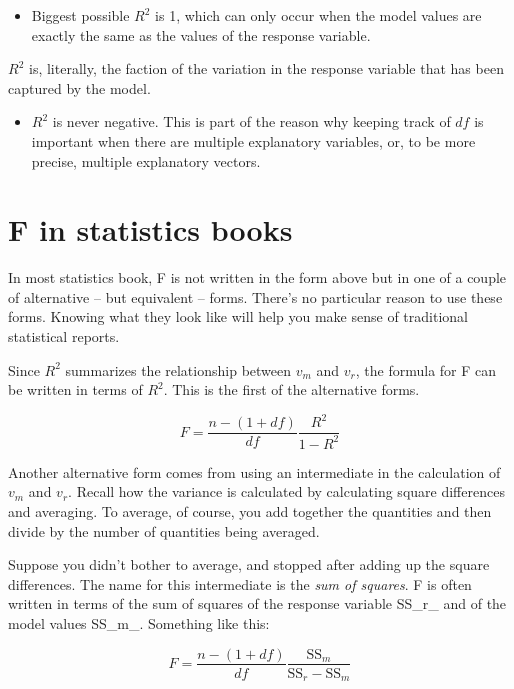 \documentclass[]{book}
\providecommand{\tightlist}{%
  \setlength{\itemsep}{0pt}\setlength{\parskip}{0pt}}
\begin{document}
\begin{itemize}
\tightlist
\item
  Biggest possible \(R^2\) is 1, which can only occur when the model values are exactly the same as the values of the response variable.
\end{itemize}

\(R^2\) is, literally, the faction of the variation in the response variable that has been captured by the model.

\begin{itemize}
\tightlist
\item
  \(R^2\) is never negative. This is part of the reason why keeping track of \(df\) is important when there are multiple explanatory variables, or, to be more precise, multiple explanatory vectors.
\end{itemize}

\hypertarget{f-in-statistics-books}{%
\section{F in statistics books}\label{f-in-statistics-books}}

In most statistics book, F is not written in the form above but in one of a couple of alternative -- but equivalent -- forms. There's no particular reason to use these forms. Knowing what they look like will help you make sense of traditional statistical reports.

Since \(R^2\) summarizes the relationship between \(v_m\) and \(v_r\), the formula for F can be written in terms of \(R^2\). This is the first of the alternative forms.

\[F = \frac{n - (1+df)}{df} \frac{R^2}{1 - R^2}\]

Another alternative form comes from using an intermediate in the calculation of \(v_m\) and \(v_r\). Recall how the variance is calculated by calculating square differences and averaging. To average, of course, you add together the quantities and then divide by the number of quantities being averaged.

Suppose you didn't bother to average, and stopped after adding up the square differences. The name for this intermediate is the \emph{sum of squares}.
F is often written in terms of the sum of squares of the response variable SS\_r\_ and of the model values SS\_m\_. Something like this:

\[F = \frac{n - (1+df)}{df} \frac{\mbox{SS}_m}{\mbox{SS}_r - \mbox{SS}_m}\]
\end{document}
